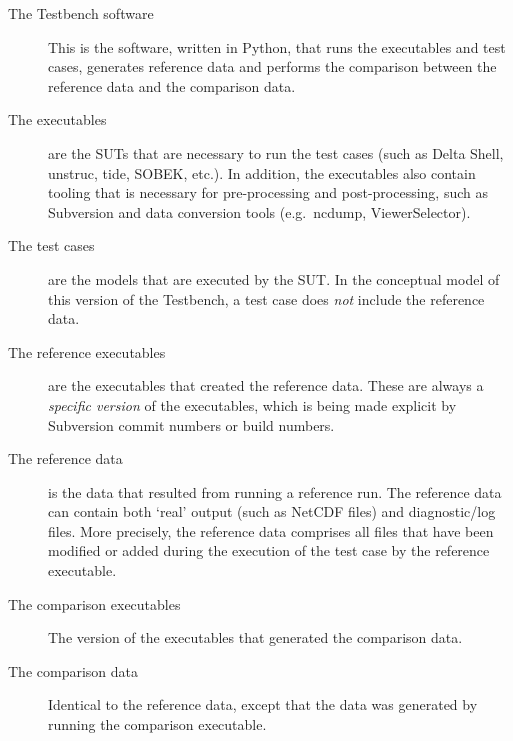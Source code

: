 \documentclass{deltares_memo}
\begin{document}
\begin{description}
\item[The Testbench software] This is the software, written in Python, that runs the executables and test cases, generates reference data and performs the comparison between the reference data and the comparison data. 
\item[The executables] are the SUTs that are necessary to run the test cases (such as Delta Shell, unstruc, tide, SOBEK, etc.). In addition, the executables also contain tooling that is necessary for pre-processing and post-processing, such as Subversion and data conversion tools (e.g.\ ncdump, ViewerSelector). 
\item[The test cases] are the models that are executed by the SUT. In the conceptual model of this version of the Testbench, a test case does {\em not} include the reference data. 
\item[The reference executables] are the executables that created the reference data. These are always a {\em specific version} of the executables, which is being made explicit by Subversion commit numbers or build numbers. 
\item[The reference data] is the data that resulted from running a reference run. The reference data can contain both `real' output (such as NetCDF files) and diagnostic/log files. More precisely, the reference data comprises all files that have been modified or added during the execution of the test case by the reference executable. 
\item[The comparison executables] The version of the executables that generated the comparison data.  
\item[The comparison data] Identical to the reference data, except that the data was generated by running the comparison executable.
\end{description}
\end{document}
